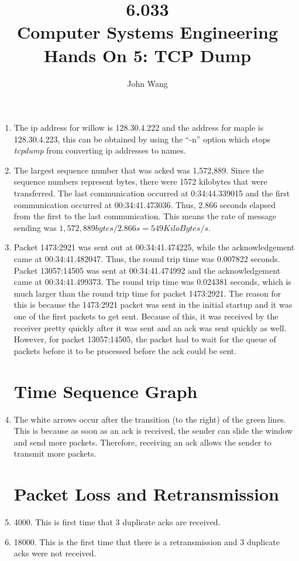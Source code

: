 \documentclass[psamsfonts]{amsart}
\title{6.033 \\
Computer Systems Engineering \\
Hands On 5: TCP Dump}
\author{John Wang}
\begin{document}
\begin{enumerate}
  \item The ip address for willow is 128.30.4.222 and the address for maple is 128.30.4.223, this can be obtained by using the ``-n'' option which stops \emph{tcpdump} from converting ip addresses to names.
  \item The largest sequence number that was acked was 1,572,889. Since the sequence numbers represent bytes, there were 1572 kilobytes that were transferred. The last communication occurred at 0:34:44.339015 and the first communication occurred at 00:34:41.473036. Thus, 2.866 seconds elapsed from the first to the last communication. This means the rate of message sending was $1,572,889 bytes / 2.866s = 549 KiloBytes/s$.
  \item Packet 1473:2921 was sent out at 00:34:41.474225, while the acknowledgement came at 00:34:41.482047. Thus, the round trip time was 0.007822 seconds. Packet 13057:14505 was sent at 00:34:41.474992 and the acknowledgement came at 00:34:41.499373. The round trip time was 0.024381 seconds, which is much larger than the round trip time for packet 1473:2921. The reason for this is because the 1473:2921 packet was sent in the initial startup and it was one of the first packets to get sent. Because of this, it was received by the receiver pretty quickly after it was sent and an ack was sent quickly as well. However, for packet 13057:14505, the packet had to wait for the queue of packets before it to be processed before the ack could be sent.

    \section{Time Sequence Graph}
  \item The white arrows occur after the transition (to the right) of the green lines. This is because as soon as an ack is received, the sender can slide the window and send more packets. Therefore, receiving an ack allows the sender to transmit more packets.

    \section{Packet Loss and Retransmission}
  \item 4000. This is first time that 3 duplicate acks are received.
  \item 18000. This is the first time that there is a retransmission and 3 duplicate acks were not received.


\end{enumerate}
\end{document}
